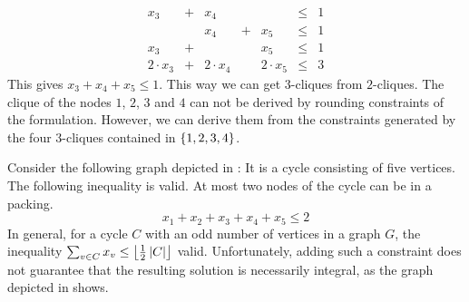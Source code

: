 {\begin{example}
\begin{equation}
\begin{array}{rcrcrcc}
x_3&+&x_4&&&\leq&1\\
&&x_4&+&x_5&\leq&1\\
x_3&+&&&x_5&\leq&1\\\hline
2\cdot x_3&+&2\cdot x_4&&2\cdot x_5&\leq&3
\end{array}
\end{equation}
This gives $x_3+x_4+x_5\leq 1$. This way we can get $3$-cliques from $2$-cliques. The clique of the nodes $1$, $2$, $3$ and $4$ can not be derived by rounding constraints of the formulation. However, we can derive them from the constraints generated by the four $3$-cliques contained in $\accl{1,2,3,4}$.
\end{example}
\begin{example}
Consider the following graph depicted in : It is a cycle consisting of five vertices. The following inequality is valid. At most two nodes of the cycle can be in a packing.
\begin{equation}
x_1+x_2+x_3+x_4+x_5\leq 2
\end{equation}
In general, for a cycle $C$ with an odd number of vertices in a graph $G$, the inequality $\isumdomain[v]{C}{x_v\leq\floor{\frac{1}{2}\abs{C}}}$ valid. Unfortunately, adding such a constraint does not guarantee that the resulting solution is necessarily integral, as the graph depicted in  shows.




\end{example}}
